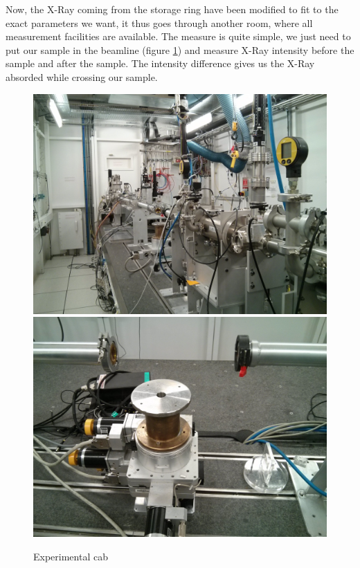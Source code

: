 \documentclass[11pt,a4paper,oneside]{report}
\begin{document}
Now, the X-Ray coming from the storage ring have been modified to fit to the exact parameters we want, it thus goes through another room, where all measurement facilities are available. The measure is quite simple, we just need to put our sample in the beamline (figure \ref{ligne_mesure}) and measure X-Ray intensity before the sample and after the sample. The intensity difference gives us the X-Ray absorded while crossing our sample.

\begin{figure}[H]
    \begin{center}
        \includegraphics[scale=0.07]{Images/IMG_20151210_203229.jpg}
        \includegraphics[scale=0.07]{Images/IMG_20151210_203316.jpg}
        \caption{Experimental cab}
        \label{ligne_mesure}
    \end{center}
\end{figure}
\end{document}
